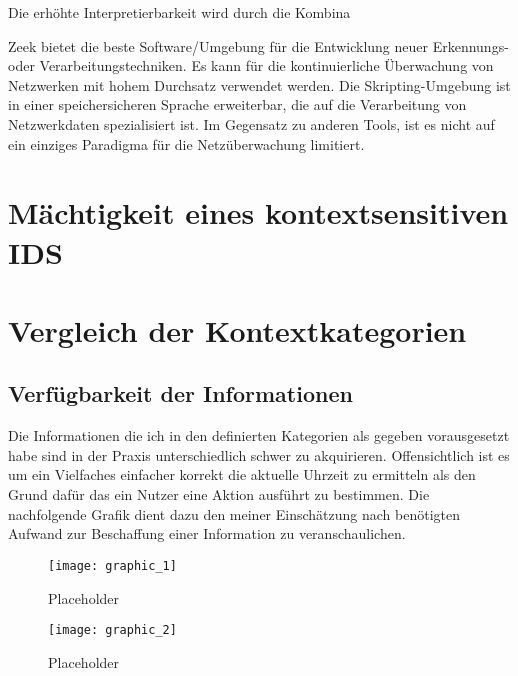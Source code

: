
Die erhöhte Interpretierbarkeit wird durch die Kombina



Zeek bietet die beste Software/Umgebung für die Entwicklung neuer Erkennungs- oder Verarbeitungstechniken. Es kann für die kontinuierliche Überwachung von Netzwerken mit hohem Durchsatz verwendet werden. Die Skripting-Umgebung ist in einer speichersicheren Sprache erweiterbar, die auf die Verarbeitung von Netzwerkdaten spezialisiert ist. Im Gegensatz zu anderen Tools, ist es nicht auf ein einziges Paradigma für die Netzüberwachung limitiert.
\section{Mächtigkeit eines kontextsensitiven IDS}  
\section{Vergleich der Kontextkategorien} 
\subsection{Verfügbarkeit der Informationen}
Die Informationen die ich in den definierten Kategorien als gegeben vorausgesetzt habe sind in der Praxis unterschiedlich schwer zu akquirieren. Offensichtlich ist es um ein Vielfaches einfacher korrekt die aktuelle Uhrzeit zu ermitteln als den Grund dafür das ein Nutzer eine Aktion ausführt zu bestimmen. Die nachfolgende Grafik dient dazu den meiner Einschätzung nach benötigten Aufwand zur Beschaffung einer Information zu veranschaulichen.
\begin{figure}[H]
\texttt{[image: graphic\_1]}
\caption{Placeholder}
\label{Placeholder}
\end{figure}
\begin{figure}[H]
\texttt{[image: graphic\_2]}
\caption{Placeholder}
\label{Placeholder}
\end{figure}

